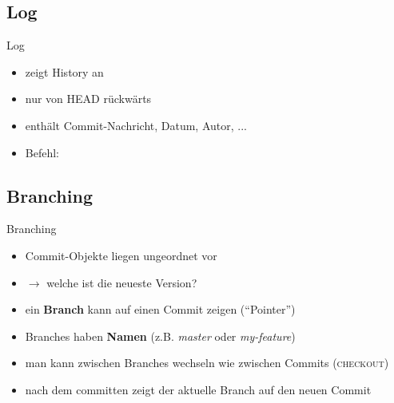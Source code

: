 
\subsection{Log}
\begin{frame}{Log}
    \begin{itemize}
        \item zeigt History an
        \item nur von HEAD rückwärts
        \item enthält Commit-Nachricht, Datum, Autor, ...
        \item Befehl:
    \end{itemize}
\end{frame}

\subsection{Branching}
\begin{frame}{Branching}
    \begin{itemize}
        \item Commit-Objekte liegen ungeordnet vor
        \item $\rightarrow$ welche ist die neueste Version?
        \item ein \textbf{Branch} kann auf einen Commit zeigen (``Pointer'')
        \item Branches haben \textbf{Namen} (z.B. \textit{master} oder \textit{my-feature})
        \item man kann zwischen Branches wechseln wie zwischen Commits (\textsc{checkout})
        \item nach dem committen zeigt der aktuelle Branch auf den neuen Commit
    \end{itemize}
\end{frame}

